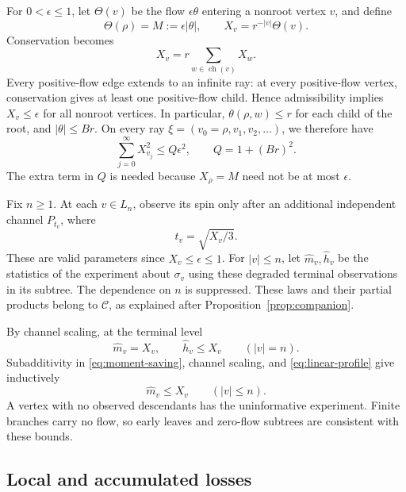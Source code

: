 \documentclass[11pt]{article}
\numberwithin{equation}{section}
\newcommand{\calC}{\mathcal C}
\newcommand{\children}{\operatorname{ch}}
\begin{document}
For $0<\epsilon\leq1$, let $\Theta(v)$ be the flow
$\epsilon\theta$ entering a nonroot vertex $v$, and define
\[
 \Theta(\rho)=M:=\epsilon|\theta|,
 \qquad X_v=r^{-|v|}\Theta(v).
\]
Conservation becomes
\begin{equation}\label{eq:linear-profile}
 X_v=r\sum_{w\in\children(v)}X_w.
\end{equation}
Every positive-flow edge extends to an infinite ray: at every
positive-flow vertex, conservation gives at least one positive-flow
child. Hence admissibility implies $X_v\leq\epsilon$ for all
nonroot vertices. In particular, $\theta(\rho,w)\leq r$ for
each child of the root, and $|\theta|\leq Br$.
On every ray $\xi=(v_0=\rho,v_1,v_2,\ldots)$, we therefore have
\begin{equation}\label{eq:path-energy}
 \sum_{j=0}^{\infty}X_{v_j}^2\leq Q\epsilon^2,
 \qquad Q=1+(Br)^2.
\end{equation}
The extra term in $Q$ is needed
because $X_\rho=M$ need not be at most $\epsilon$.

Fix $n\geq1$. At each $v\in L_n$, observe its spin only after
an additional independent channel $P_{t_v}$, where
\begin{equation}\label{eq:terminal-noise}
 t_v=\sqrt{X_v/3}.
\end{equation}
These are valid parameters since $X_v\leq\epsilon\leq1$.
For $|v|\leq n$, let $\widehat m_v,\widehat h_v$ be the
statistics of the experiment about $\sigma_v$ using these
degraded terminal observations in its subtree. The dependence
on $n$ is suppressed. These laws and their partial products
belong to $\calC$, as explained after
Proposition~\ref{prop:companion}.

By channel scaling, at the terminal level
\begin{equation}\label{eq:terminal-values}
 \widehat m_v=X_v,\qquad \widehat h_v\leq X_v
 \qquad (|v|=n).
\end{equation}
Subadditivity in \eqref{eq:moment-saving}, channel scaling,
and \eqref{eq:linear-profile} give inductively
\begin{equation}\label{eq:m-below-profile}
 \widehat m_v\leq X_v\qquad (|v|\leq n).
\end{equation}
A vertex with no observed descendants has the uninformative
experiment. Finite branches carry no flow, so early leaves and
zero-flow subtrees are consistent with these bounds.

\subsection{Local and accumulated losses}
\end{document}
